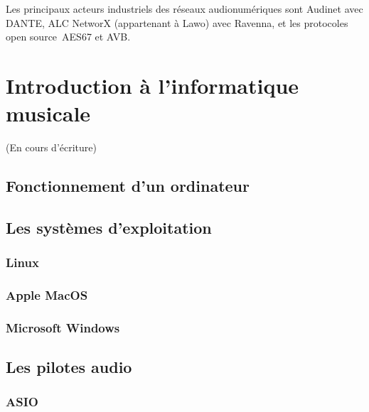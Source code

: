 \documentclass[
  letterpaper,
  DIV=11,
  numbers=noendperiod]{scrreprt}
\begin{document}
Les principaux acteurs industriels des réseaux audionumériques sont
Audinet avec DANTE, ALC NetworX (appartenant à Lawo) avec Ravenna, et
les protocoles open source~AES67 et AVB.

\hypertarget{introduction-uxe0-linformatique-musicale}{%
\chapter{Introduction à l'informatique
musicale}\label{introduction-uxe0-linformatique-musicale}}

(En cours d'écriture)

\hypertarget{fonctionnement-dun-ordinateur}{%
\section{Fonctionnement d'un
ordinateur}\label{fonctionnement-dun-ordinateur}}

\hypertarget{les-systuxe8mes-dexploitation}{%
\section{Les systèmes
d'exploitation}\label{les-systuxe8mes-dexploitation}}

\hypertarget{linux}{%
\subsection{Linux}\label{linux}}

\hypertarget{apple-macos}{%
\subsection{Apple MacOS}\label{apple-macos}}

\hypertarget{microsoft-windows}{%
\subsection{Microsoft Windows}\label{microsoft-windows}}

\hypertarget{les-pilotes-audio}{%
\section{Les pilotes audio}\label{les-pilotes-audio}}

\hypertarget{asio}{%
\subsection{ASIO}\label{asio}}
\end{document}
